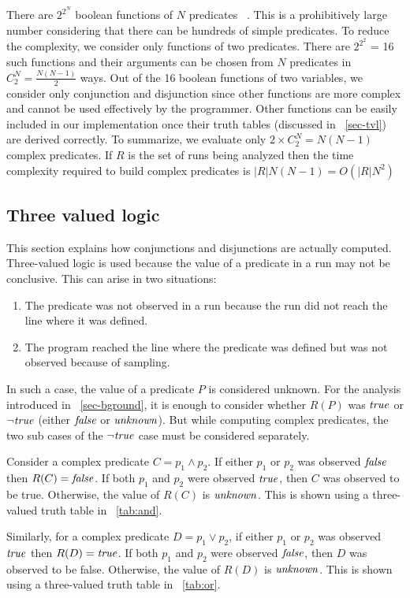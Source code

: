 There are $2^{2^N}$ boolean functions of $N$ predicates ~\cite{MathWorld:BoolFuncs}.  This is a prohibitively large number considering that there can be hundreds of simple predicates.  To reduce the complexity, we consider only functions of two predicates.  There are $2^{2^2}$ = 16 such functions and their arguments can be chosen from $N$ predicates in $C^N_2 = \frac{N(N-1)}{2}$ ways.  Out of the 16 boolean functions of two variables, we consider only conjunction and disjunction since other functions are more complex and cannot be used effectively by the programmer.  Other functions can be easily included in our implementation once their truth tables (discussed in ~\autoref{sec-tvl}) are derived correctly.  To summarize, we evaluate only $2 \times C^N_2 = N(N-1)$ complex predicates.  If $R$ is the set of runs being analyzed then the time complexity required to build complex predicates is $|R|N(N-1) = O(|R|N^2)$

\subsection{Three valued logic}
\label{sec-tvl}
This section explains how conjunctions and disjunctions are actually computed.  Three-valued logic is used because the value of a predicate in a run may not be conclusive. This can arise in two situations:
\begin{enumerate}
\item The predicate was not observed in a run because the run did not reach the line where it was defined.
\item The program reached the line where the predicate was defined but was not observed because of sampling.
\end{enumerate}

In such a case, the value of a predicate $P$ is considered unknown.  For the analysis introduced in ~\autoref{sec-bground}, it is enough to consider whether $R(P)$ was $\mathit{true}$ or $\neg \mathit{true}$ (either $\mathit{false}$ or $\mathit{unknown}$).  But while computing complex predicates, the two sub cases of the $\neg \mathit{true}$ case must be considered separately.

Consider a complex predicate $C = p_1 \wedge p_2$.  If either $p_1$ or $p_2$ was observed $\mathit{false}$ then $R(C) = \mathit{false}$.  If both $p_1$ and $p_2$ were observed $\mathit{true}$, then $C$ was observed to be true.  Otherwise, the value of $R(C)$ is $\mathit{unknown}$.  This is shown using a three-valued truth table in ~\autoref{tab:and}.

Similarly, for a complex predicate $D = p_1 \vee p_2$, if either $p_1$ or $p_2$ was observed $\mathit{true}$ then $R(D) = \mathit{true}$.  If both $p_1$ and $p_2$ were observed $\mathit{false}$, then $D$ was observed to be false.  Otherwise, the value of $R(D)$ is $\mathit{unknown}$.  This is shown using a three-valued truth table in ~\autoref{tab:or}.
 
